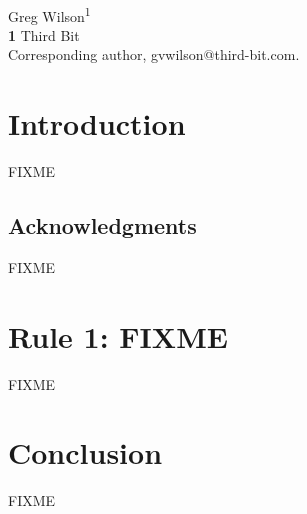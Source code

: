 \documentclass[10pt,letterpaper]{article}
\begin{document}
\vspace*{0.2in}

\begin{flushleft}
    {\Large
        \textbf{}
    }
    \newline
    \\
    {Greg Wilson}\textsuperscript{1{\ddag}}
    \\
    \bigskip
    \textbf{1} Third Bit\\
    {\ddag} Corresponding author, gvwilson@third-bit.com.
\end{flushleft}

\section*{Introduction}

FIXME

\subsection*{Acknowledgments}

FIXME

\section*{Rule 1: FIXME}

FIXME

\section*{Conclusion}

FIXME

\nocite{*}

\end{document}
